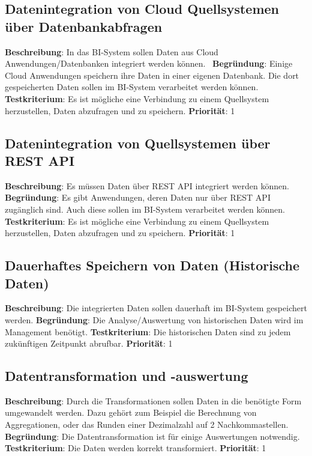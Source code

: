 \subsection{Datenintegration von Cloud Quellsystemen über Datenbankabfragen} \label{sec:anforderungsspezifikation:datenintegrationCloudDB}
\textbf{Beschreibung}: In das BI-System sollen Daten aus Cloud Anwendungen/Datenbanken integriert werden können.  
\newline \textbf{Begründung}: Einige Cloud Anwendungen speichern ihre Daten in einer eigenen Datenbank. Die dort gespeicherten Daten sollen im BI-System verarbeitet werden können.
\newline \textbf{Testkriterium}: Es ist mögliche eine Verbindung zu einem Quellsystem herzustellen, Daten abzufragen und zu speichern.
\newline \textbf{Priorität}: 1

\subsection{Datenintegration von Quellsystemen über REST API} \label{sec:anforderungsspezifikation:datenintegrationREST}
\textbf{Beschreibung}: Es müssen Daten über REST API integriert werden können. 
\newline \textbf{Begründung}: Es gibt Anwendungen, deren Daten nur über REST API zugänglich sind. Auch diese sollen im BI-System verarbeitet werden können.
\newline \textbf{Testkriterium}: Es ist mögliche eine Verbindung zu einem Quellsystem herzustellen, Daten abzufragen und zu speichern.
\newline \textbf{Priorität}: 1

\subsection{Dauerhaftes Speichern von Daten (Historische Daten)} \label{sec:anforderungsspezifikation:dauerhaftesSpeichern}
\textbf{Beschreibung}: Die integrierten Daten sollen dauerhaft im BI-System gespeichert werden.
\newline \textbf{Begründung}: Die Analyse/Auswertung von historischen Daten wird im Management benötigt.
\newline \textbf{Testkriterium}: Die historischen Daten sind zu jedem zukünftigen Zeitpunkt abrufbar.
\newline \textbf{Priorität}: 1

\subsection{Datentransformation und -auswertung} \label{sec:anforderungsspezifikation:datentransformation}
\textbf{Beschreibung}: Durch die Transformationen sollen Daten in die benötigte Form umgewandelt werden. Dazu gehört zum Beispiel die Berechnung von Aggregationen, oder das Runden einer Dezimalzahl auf 2 Nachkommastellen.
\newline \textbf{Begründung}: Die Datentransformation ist für einige Auswertungen notwendig.
\newline \textbf{Testkriterium}: Die Daten werden korrekt transformiert.
\newline \textbf{Priorität}: 1

